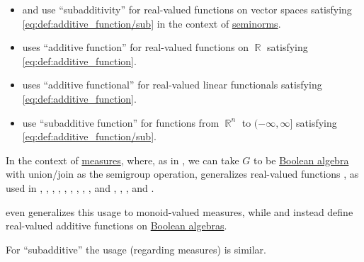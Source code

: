 \begin{remark}
\begin{itemize}
    \item {} and  use \enquote{subadditivity} for real-valued functions on vector spaces satisfying \eqref{eq:def:additive_function/sub} in the context of \hyperref[def:seminorm]{seminorms}.

    \item {} uses \enquote{additive function} for real-valued functions on \( \BbbR \) satisfying \eqref{eq:def:additive_function}.

    \item {} uses \enquote{additive functional} for real-valued linear functionals satisfying \eqref{eq:def:additive_function}.

    \item {} use \enquote{subadditive function} for functions from \( \BbbR^n \) to \( (-\infty, \infty] \) satisfying \eqref{eq:def:additive_function/sub}.
  \end{itemize}

  In the context of \hyperref[def:measure]{measures}, where, as in , we can take \( G \) to be \hyperref[def:boolean_algebra]{Boolean algebra} with union/join as the semigroup operation,  generalizes  real-valued functions , as used in
  \cite[13]{Malliavin1995IntegrationAndProbability},
  \cite[21]{Schervish1995TheoryOfStatistics},
  \cite[25]{Folland1999RealAnalysis},
  \cite[7]{Cohn2013MeasureTheory},
  \cite[30]{Halmos1976MeasureTheory},
  \cite[6]{Tao2011MeasureTheory},
  \cite[21]{Schervish1995TheoryOfStatistics},
  \cite[71]{Yoshida1980FunctionalAnalysis},
  \cite[51]{КанторовичАкилов1984ФункциональныйАнализ},
  \cite[86]{Вулих1973ВещественныйАнализ} and
  \cite[thm. VI.2.3]{Натансон1974ВещественныйАнализ},
  \cite[15]{Боровков1999ТеорияВероятностей},
  \cite[def. 1.3.1]{Богачёв2003ОсновыТеорииМерыТом1},
  \cite[def. II.1.2]{Ширяев2007ВероятностьТом1} and
  \cite[21]{ДимитровЯнев2007ВероятностиИСтатистика}.

   even generalizes this usage to monoid-valued measures, while  and  instead define real-valued additive functions on \hyperref[def:boolean_algebra]{Boolean algebras}.

  For \enquote{subadditive} the usage (regarding measures) is similar.
\end{remark}

